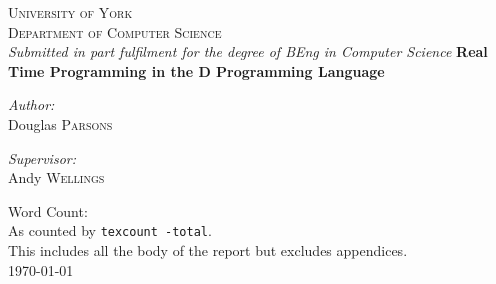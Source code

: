 \begin{titlepage}
\begin{center}


\textsc{\LARGE University of York}\\[1.5cm]

\textsc{\Large Department of Computer Science}\\[0.5cm]
\emph{Submitted in part fulfilment for the degree of BEng in Computer Science}
\HRule{\\[0.4cm]}
{\huge\bfseries{Real Time Programming in the D Programming Language}\\[0.4cm] }

\HRule{\\[1.5cm]}

\noindent
\begin{minipage}[t]{0.4\textwidth}
\begin{flushleft} \large
\emph{Author:}\\
Douglas \textsc{Parsons}
\end{flushleft}
\end{minipage}
\begin{minipage}[t]{0.4\textwidth}
\begin{flushright} \large
\emph{Supervisor:} \\
Andy \textsc{Wellings}
\end{flushright}
\end{minipage}

\vfill
 
{\small Word Count: \wordcount \\}
\vspace{5mm}
{\small As counted by \texttt{texcount -total}. \\This includes all the body of the
report but excludes appendices.\\}
\vspace{15mm}
{\large \today}

\end{center}
\end{titlepage}
